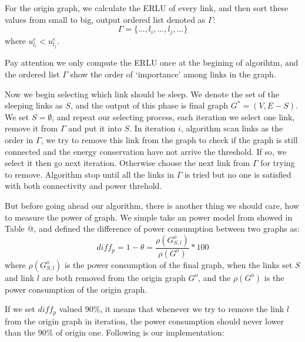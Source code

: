 \documentclass[conference]{IEEEtran}
\makeatletter
\newcommand{\Rmnum}[1]{\expandafter\@slowromancap\romannumeral #1@}
\makeatother
\begin{document}
For the origin graph, we calculate the ERLU of every link, and then sort these values
from small to big, output ordered list denoted as $\Gamma$: 
\begin{equation}
	\Gamma = \{..., l_i, ..., l_j, ...\}
\end{equation}
where $u^e_{l_i} < u^e_{l_j}$.


Pay attention we only compute the ERLU once at the begining of algorihtm, and the ordered list $\Gamma$ show 
the order of `importance' among links in the graph. 


Now we begin selecting which link should be sleep.
We denote the set of the sleeping links as $S$, and the output of this phase is final graph $G^* = (V, E-S)$. We set 
$S = \emptyset$, and repeat our selecting process, each iteration we select one link, remove it from $\Gamma$ and put it into $S$. 
In iteration $i$, algorithm scan links as the order in $\Gamma$, we try to
remove this link from the graph to check if the graph is still connected and the energy conservation have not arrive the threshold.
If so, we select it then go next iteration.
Otherwise choose the next link from $\Gamma$ for trying to remove. Algorithm
stop until all the links in $\Gamma$ is tried but no one is satisfied with both connectivity and power threhold.


But before going ahead our algorithm, there is another thing we should care, how to measure the power of graph.
We simple take an power model from \cite{networking:greente} showed in Table \Rmnum{2}, and defined the difference of power consumption 
between two graphs as:
\begin{equation}
	diff_p = 1 - \theta = \frac{\rho(G_{S, l}^o)} {\rho(G^o)} * 100
\end{equation}
where $\rho(G_{S, l}^o)$ is the power consumption of the final graph, when the links set $S$ and 
link $l$ are both removed from the origin graph $G^o$, and the $\rho(G^o)$ is the power consumption of 
the origin graph.


If we set $diff_p$ valued 90\%, it means that whenever we try to remove the link $l$ from the origin graph in 
iteration, the power consumption should never lower than the 90\% of origin one. Following is our implementation: 
\end{document}
